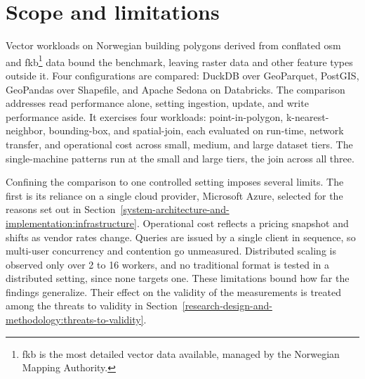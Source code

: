 \section{Scope and limitations}
\label{introduction:scope-and-limitations}
Vector workloads on Norwegian building polygons derived from conflated \acrshort{osm} and \acrfull{fkb}\footnote{\acrshort{fkb} is the most detailed vector data available, managed by the Norwegian Mapping Authority.} data bound the benchmark, leaving raster data and other feature types outside it. Four configurations are compared: DuckDB over GeoParquet, PostGIS, GeoPandas over Shapefile, and Apache Sedona on Databricks. The comparison addresses read performance alone, setting ingestion, update, and write performance aside. It exercises four workloads: point-in-polygon, k-nearest-neighbor, bounding-box, and spatial-join, each evaluated on run-time, network transfer, and operational cost across small, medium, and large dataset tiers. The single-machine patterns run at the small and large tiers, the join across all three.

Confining the comparison to one controlled setting imposes several limits. The first is its reliance on a single cloud provider, Microsoft Azure, selected for the reasons set out in Section~\ref{system-architecture-and-implementation:infrastructure}. Operational cost reflects a pricing snapshot and shifts as vendor rates change. Queries are issued by a single client in sequence, so multi-user concurrency and contention go unmeasured. Distributed scaling is observed only over 2 to 16 workers, and no traditional format is tested in a distributed setting, since none targets one. These limitations bound how far the findings generalize. Their effect on the validity of the measurements is treated among the threats to validity in Section~\ref{research-design-and-methodology:threats-to-validity}.